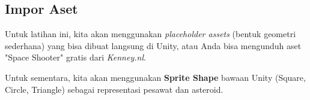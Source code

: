 \subsection{Impor Aset}

Untuk latihan ini, kita akan menggunakan \textit{placeholder assets} (bentuk geometri sederhana) yang bisa dibuat langsung di Unity, atau Anda bisa mengunduh aset "Space Shooter" gratis dari \textit{Kenney.nl}.

\begin{tips}
Untuk sementara, kita akan menggunakan \textbf{Sprite Shape} bawaan Unity (Square, Circle, Triangle) sebagai representasi pesawat dan asteroid.
\end{tips}
